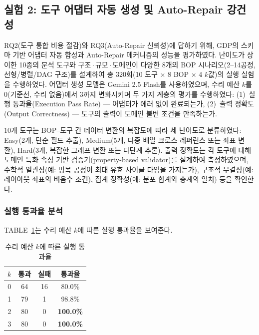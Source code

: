 \documentclass[conference]{IEEEtran}
\begin{document}
\subsection{실험 2: 도구 어댑터 자동 생성 및 Auto-Repair 강건성}

RQ2(도구 통합 비용 절감)와 RQ3(Auto-Repair 신뢰성)에 답하기 위해, GDP의 스키마 기반 어댑터 자동 합성과 Auto-Repair 메커니즘의 성능을 평가하였다. 난이도가 상이한 10종의 분석 도구와 구조\,$\cdot$\,규모\,$\cdot$\,도메인이 다양한 8개의 BOP 시나리오(2--14공정, 선형/병렬/DAG 구조)를 설계하여 총 320회(10 도구 $\times$ 8 BOP $\times$ 4 $k$값)의 실행 실험을 수행하였다. 어댑터 생성 모델은 Gemini 2.5 Flash를 사용하였으며, 수리 예산 $k$를 0(기준선, 수리 없음)에서 3까지 변화시키며 두 가지 계층의 평가를 수행하였다: (1)~실행 통과율(Execution Pass Rate) --- 어댑터가 에러 없이 완료되는가, (2)~출력 정확도(Output Correctness) --- 도구의 출력이 도메인 불변 조건을 만족하는가.

10개 도구는 BOP--도구 간 데이터 변환의 복잡도에 따라 세 난이도로 분류하였다: Easy(2개, 단순 필드 추출), Medium(5개, 다중 배열 크로스 레퍼런스 또는 좌표 변환), Hard(3개, 복잡한 그래프 변환 또는 다단계 추론). 출력 정확도는 각 도구에 대해 도메인 특화 속성 기반 검증기(property-based validator)를 설계하여 측정하였으며, 수학적 일관성(예: 병목 공정이 최대 유효 사이클 타임을 가지는가), 구조적 무결성(예: 레이아웃 좌표의 비음수 조건), 집계 정확성(예: 분포 합계와 총계의 일치) 등을 확인한다.

\subsubsection{실행 통과율 분석}

TABLE~\ref{tab:pass_rate}는 수리 예산 $k$에 따른 실행 통과율을 보여준다.

\begin{table}[!t]
\caption{수리 예산 $k$에 따른 실행 통과율}
\label{tab:pass_rate}
\centering
\begin{tabular}{c c c c}
\hline
$k$ & \textbf{통과} & \textbf{실패} & \textbf{통과율} \\
\hline
0 & 64 & 16 & 80.0\% \\
1 & 79 & 1  & 98.8\% \\
2 & 80 & 0  & \textbf{100.0\%} \\
3 & 80 & 0  & \textbf{100.0\%} \\
\hline
\end{tabular}
\end{table}
\end{document}
